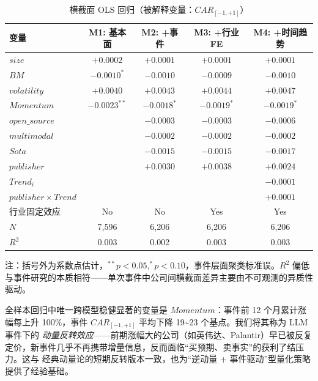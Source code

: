 \documentclass[11pt]{ctexart}
\begin{document}
\begin{table}[htbp]
\centering
\caption{横截面 OLS 回归（被解释变量：$CAR_{[-1,+1]}$）}
\label{tab:main_ols}
\small
\begin{tabular}{lcccc}
\toprule
变量 & M1: 基本面 & M2: +事件 & M3: +行业FE & M4: +时间趋势 \\
\midrule
$size$              & $+0.0002$         & $+0.0001$         & $+0.0001$         & $+0.0001$ \\
$BM$                & $-0.0010^{*}$     & $-0.0010$         & $-0.0009$         & $-0.0010$ \\
$volatility$        & $+0.0040$         & $+0.0043$         & $+0.0044$         & $+0.0047$ \\
$Momentum$          & $\mathbf{-0.0023^{**}}$ & $-0.0018^{*}$     & $-0.0019^{*}$     & $-0.0019^{*}$ \\
$open\_source$      &                   & $-0.0003$         & $-0.0003$         & $-0.0006$ \\
$multimodal$        &                   & $-0.0002$         & $-0.0002$         & $-0.0002$ \\
$Sota$              &                   & $-0.0015$         & $-0.0015$         & $-0.0017$ \\
$publisher$         &                   & $+0.0030$         & $+0.0038$         & $+0.0024$ \\
$Trend_i$           &                   &                   &                   & $-0.0001$ \\
$publisher\times Trend$ &               &                   &                   & $+0.0001$ \\
\midrule
行业固定效应 & No & No & Yes & Yes \\
$N$            & 7{,}596 & 6{,}206 & 6{,}206 & 6{,}206 \\
$R^2$          & 0.003 & 0.002 & 0.003 & 0.003 \\
\bottomrule
\end{tabular}
\begin{tablenotes}\footnotesize
\item 注：括号外为系数点估计，$^{**}p<0.05, ^{*}p<0.10$，事件层面聚类标准误。$R^2$ 偏低与事件研究的本质相符——单次事件中公司间横截面差异主要由不可观测的异质性驱动。
\end{tablenotes}
\end{table}

全样本回归中唯一跨模型稳健显著的变量是 \textbf{$Momentum$}：事件前 12 个月累计涨幅每上升 100\%，事件 $CAR_{[-1,+1]}$ 平均下降 19\textasciitilde 23 个基点。我们将其称为 LLM 事件下的 \emph{动量反转效应}——前期涨幅大的公司（如英伟达、Palantir）早已被反复定价，新事件几乎不再携带增量信息，反而面临“买预期、卖事实”的获利了结压力。这与 \cite{JegadeeshTitman1993} 经典动量论的短期反转版本一致，也为“逆动量 + 事件驱动”型量化策略提供了经验基础。
\end{document}

